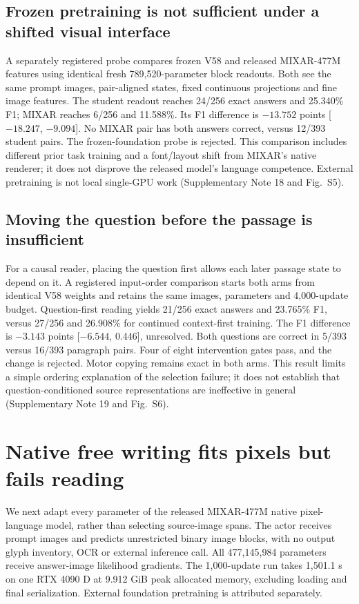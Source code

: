 \subsection*{Frozen pretraining is not sufficient under a shifted visual interface}
A separately registered probe compares frozen V58 and released MIXAR-477M\cite{mixar}
features using identical fresh 789,520-parameter block readouts. Both see
the same prompt images, pair-aligned states, fixed continuous projections and
fine image features. The student readout reaches 24/256 exact answers and
25.340\% F1; MIXAR reaches 6/256 and 11.588\%. Its F1 difference is
$-13.752$ points [$-18.247$, $-9.094$]. No MIXAR pair has both answers correct,
versus 12/393 student pairs. The frozen-foundation probe is rejected.
This comparison includes different prior task training and a font/layout
shift from MIXAR's native renderer; it does not disprove the released model's
language competence. External pretraining is not local single-GPU work
(Supplementary Note 18 and Fig.~S5).

\subsection*{Moving the question before the passage is insufficient}
For a causal reader, placing the question first allows each later passage
state to depend on it. A registered input-order comparison starts both arms
from identical V58 weights and retains the same images, parameters and
4,000-update budget. Question-first reading yields 21/256 exact answers and
23.765\% F1, versus 27/256 and 26.908\% for continued context-first training.
The F1 difference is $-3.143$ points [$-6.544$, 0.446], unresolved. Both
questions are correct in 5/393 versus 16/393 paragraph pairs. Four of eight
intervention gates pass, and the change is rejected. Motor copying remains
exact in both arms. This result limits a simple ordering explanation of the
selection failure; it does not establish that question-conditioned source
representations are ineffective in general (Supplementary Note 19 and Fig.~S6).

\section*{Native free writing fits pixels but fails reading}
We next adapt every parameter of the released MIXAR-477M native
pixel-language model\cite{mixar}, rather than selecting source-image spans.
The actor receives prompt images and predicts unrestricted binary image
blocks, with no output glyph inventory, OCR or external inference call.
All 477,145,984 parameters receive answer-image likelihood gradients.
The 1,000-update run takes 1,501.1 s on one RTX 4090 D at 9.912 GiB peak
allocated memory, excluding loading and final serialization. External
foundation pretraining is attributed separately.

